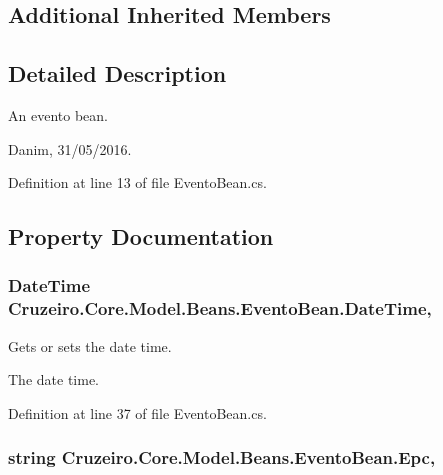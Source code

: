 \subsection*{Additional Inherited Members}


\subsection{Detailed Description}
An evento bean. 

Danim, 31/05/2016. 

Definition at line 13 of file Evento\+Bean.\+cs.



\subsection{Property Documentation}
\subsubsection[{\texorpdfstring{Date\+Time}{DateTime}}]{\setlength{\rightskip}{0pt plus 5cm}Date\+Time Cruzeiro.\+Core.\+Model.\+Beans.\+Evento\+Bean.\+Date\+Time\hspace{0.3cm}{\ttfamily [get]}, {\ttfamily [set]}}\hypertarget{class_cruzeiro_1_1_core_1_1_model_1_1_beans_1_1_evento_bean_a60849766788c6c5a6b0acac6d3581f09}{}\label{class_cruzeiro_1_1_core_1_1_model_1_1_beans_1_1_evento_bean_a60849766788c6c5a6b0acac6d3581f09}


Gets or sets the date time. 

The date time. 

Definition at line 37 of file Evento\+Bean.\+cs.

\subsubsection[{\texorpdfstring{Epc}{Epc}}]{\setlength{\rightskip}{0pt plus 5cm}string Cruzeiro.\+Core.\+Model.\+Beans.\+Evento\+Bean.\+Epc\hspace{0.3cm}{\ttfamily [get]}, {\ttfamily [set]}}\hypertarget{class_cruzeiro_1_1_core_1_1_model_1_1_beans_1_1_evento_bean_ace771b0d1482e9cb424ea7ec0f821ad2}{}\label{class_cruzeiro_1_1_core_1_1_model_1_1_beans_1_1_evento_bean_ace771b0d1482e9cb424ea7ec0f821ad2}


